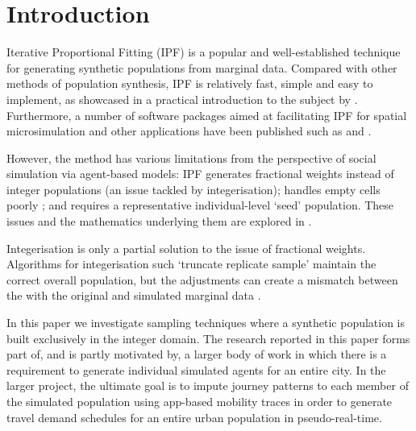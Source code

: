 \documentclass{JASSS}
\begin{document}



\section{Introduction}\label{introduction}

Iterative Proportional Fitting (IPF) is a popular and well-established
technique for generating synthetic populations from marginal data.
Compared with other methods of population synthesis, IPF is relatively
fast, simple and easy to implement, as showcased in a practical
introduction to the subject by \cite{lovelace_spatial_2016}. Furthermore,
a number of software packages aimed at facilitating IPF for spatial
microsimulation and other applications have been published
such as \cite{barthelemy_cran_2016} and \cite{jones_raker:_2016}.

However, the method has various limitations from the perspective of
social simulation via agent-based models: IPF
generates fractional weights instead of integer populations
(an issue tackled by integerisation);
handles empty cells poorly \citep{lovelace_evaluating_2015};
and requires a representative individual-level `seed' population.
These issues and the mathematics underlying them are explored
in \cite{zaloznik_iterative_2011}.

Integerisation is only a partial solution to the issue of fractional weights.
Algorithms for integerisation such `truncate replicate sample'
maintain the correct overall population,
but the adjustments can create a mismatch between the with the original
and simulated marginal data \citep{lovelace_truncate_2013}.

In this paper we investigate sampling techniques where a synthetic population is built exclusively in the integer domain. The research reported in this paper forms part of, and is partly motivated by, a larger body of work in which there is a requirement to generate individual simulated agents for an entire city. In the larger project, the ultimate goal is to impute journey patterns to each member of the simulated population using app-based mobility traces in order to generate travel demand schedules for an entire urban population in pseudo-real-time.
\end{document}

